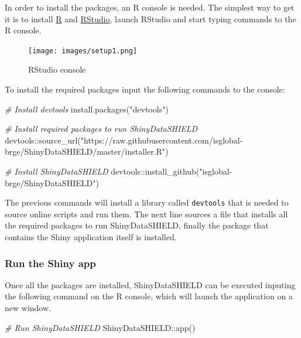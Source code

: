 \documentclass[
]{book}
\newenvironment{Shaded}{\begin{snugshade}}{\end{snugshade}}
\newcommand{\CommentTok}[1]{\textcolor[rgb]{0.56,0.35,0.01}{\textit{#1}}}
\newcommand{\FunctionTok}[1]{\textcolor[rgb]{0.00,0.00,0.00}{#1}}
\newcommand{\NormalTok}[1]{#1}
\newcommand{\SpecialCharTok}[1]{\textcolor[rgb]{0.00,0.00,0.00}{#1}}
\newcommand{\StringTok}[1]{\textcolor[rgb]{0.31,0.60,0.02}{#1}}
\begin{document}
In order to install the packages, an R console is needed. The simplest way to get it is to install \href{https://cloud.r-project.org/}{R} and \href{https://rstudio.com/products/rstudio/download/}{RStudio}, launch RStudio and start typing commands to the R console.

\begin{figure}
\centering
\texttt{[image: images/setup1.png]}
\caption{RStudio console}
\end{figure}

To install the required packages input the following commands to the console:

\begin{Shaded}
\begin{Highlighting}[]
\CommentTok{\# Install devtools}
\FunctionTok{install.packages}\NormalTok{(}\StringTok{"devtools"}\NormalTok{)}

\CommentTok{\# Install required packages to run ShinyDataSHIELD}
\NormalTok{devtools}\SpecialCharTok{::}\FunctionTok{source\_url}\NormalTok{(}\StringTok{"https://raw.githubusercontent.com/isglobal{-}brge/ShinyDataSHIELD/master/installer.R"}\NormalTok{)}

\CommentTok{\# Install ShinyDataSHIELD}
\NormalTok{devtools}\SpecialCharTok{::}\FunctionTok{install\_github}\NormalTok{(}\StringTok{"isglobal{-}brge/ShinyDataSHIELD"}\NormalTok{)}
\end{Highlighting}
\end{Shaded}

The previous commands will install a library called \texttt{devtools} that is needed to source online scripts and run them. The next line sources a file that installs all the required packages to run ShinyDataSHIELD, finally the package that contains the Shiny application itself is installed.

\hypertarget{run-the-shiny-app}{%
\subsubsection{Run the Shiny app}\label{run-the-shiny-app}}

Once all the packages are installed, ShinyDataSHIELD can be executed inputing the following command on the R console, which will launch the application on a new window.

\begin{Shaded}
\begin{Highlighting}[]
\CommentTok{\# Run ShinyDataSHIELD}
\NormalTok{ShinyDataSHIELD}\SpecialCharTok{::}\FunctionTok{app}\NormalTok{()}
\end{Highlighting}
\end{Shaded}
\end{document}
